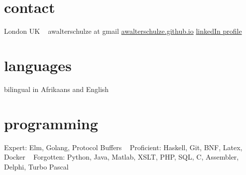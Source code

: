 \documentclass[]{friggeri-cv-a4} %
\begin{document}

\begin{aside} %
\section{contact}
London
UK
~
awalterschulze at gmail
\href{https://awalterschulze.github.io}{awalterschulze.github.io}
\href{https://za.linkedin.com/in/schulzewalter}{linkedIn profile}
\section{languages}
bilingual in Afrikaans and English
\section{programming}
Expert: 
Elm, Golang, Protocol Buffers
~
Proficient: 
Haskell, Git, BNF, Latex, Docker
~
Forgotten:
Python, Java, Matlab, XSLT, PHP, SQL, C, Assembler, Delphi, Turbo Pascal
\end{aside}
\end{document}
